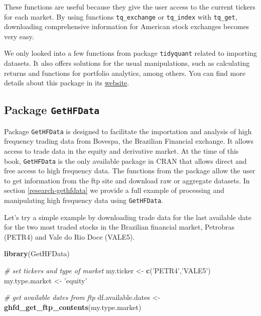 \documentclass[11pt,]{book}
\newenvironment{Shaded}{\begin{snugshade}}{\end{snugshade}}
\newcommand{\KeywordTok}[1]{\textcolor[rgb]{0.27,0.27,0.27}{\textbf{#1}}}
\newcommand{\StringTok}[1]{\textcolor[rgb]{0.5,0.5,0.5}{#1}}
\newcommand{\CommentTok}[1]{\textcolor[rgb]{0.56,0.35,0.01}{\textit{#1}}}
\newcommand{\NormalTok}[1]{#1}
\begin{document}
These functions are useful because they give the user access to the
current tickers for each market. By using functions
\texttt{tq\_exchange} or \texttt{tq\_index} with \texttt{tq\_get},
downloading comprehensive information for American stock exchanges
becomes very easy. 

We only looked into a few functions from package \texttt{tidyquant}
related to importing datasets. It also offers solutions for the usual
manipulations, such as calculating returns and functions for portfolio
analytics, among others. You can find more details about this package in
its \href{http://www.business-science.io/r-packages.html}{website}.

\subsection{\texorpdfstring{Package
\texttt{GetHFData}}{Package GetHFData}}\label{package-gethfdata}

Package \texttt{GetHFData} \citep{gethfdata} is designed to facilitate
the importation and analysis of high frequency trading data from
Bovespa, the Brazilian Financial exchange. It allows access to trade
data in the equity and derivative market. At the time of this book,
\texttt{GetHFData} is the only available package in CRAN that allows
direct and free access to high frequency data. The functions from the
package allow the user to get information from the ftp site and download
raw or aggregate datasets. In section \ref{research-gethfdata} we
provide a full example of processing and manipulating high frequency
data using \texttt{GetHFData}.

Let's try a simple example by downloading trade data for the last
available date for the two most traded stocks in the Brazilian financial
market, Petrobras (PETR4) and Vale do Rio Doce (VALE5).

\begin{Shaded}
\begin{Highlighting}[]
\KeywordTok{library}\NormalTok{(GetHFData)}

\CommentTok{# set tickers and type of market}
\NormalTok{my.ticker <-}\StringTok{ }\KeywordTok{c}\NormalTok{(}\StringTok{'PETR4'}\NormalTok{,}\StringTok{'VALE5'}\NormalTok{)}
\NormalTok{my.type.market <-}\StringTok{ 'equity'}

\CommentTok{# get available dates from ftp}
\NormalTok{df.available.dates <-}\StringTok{ }\KeywordTok{ghfd_get_ftp_contents}\NormalTok{(my.type.market)}
\end{Highlighting}
\end{Shaded}
\end{document}
